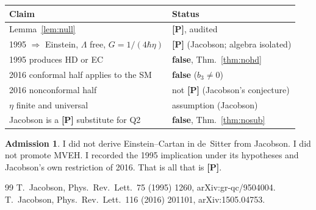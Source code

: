 \documentclass[11pt]{article}
\theoremstyle{definition}
\newtheorem*{admission}{Admission}
\newcommand{\pP}{\textbf{[P]}}
\begin{document}
\begin{center}
\begin{tabular}{@{}p{}p{}@{}}
\toprule
Claim & Status \\
\midrule
Lemma~\ref{lem:null} & \pP{}, audited \\
1995 $\Rightarrow$ Einstein, $\Lambda$ free, $G=1/(4\hbar\eta)$
  & \pP{} (Jacobson; algebra isolated) \\
1995 produces HD or EC & \textbf{false}, Thm.~\ref{thm:nohd} \\
2016 conformal half applies to the SM & \textbf{false} ($b_3\neq 0$) \\
2016 nonconformal half & not \pP{} (Jacobson's conjecture) \\
$\eta$ finite and universal & assumption (Jacobson) \\
Jacobson is a \pP{} substitute for Q2 & \textbf{false},
  Thm.~\ref{thm:nosub} \\
\bottomrule
\end{tabular}
\end{center}

\begin{admission}
I did not derive Einstein--Cartan in de~Sitter from Jacobson. I
did not promote MVEH. I recorded the 1995 implication under its
hypotheses and Jacobson's own restriction of 2016. That is all
that is \pP{}.
\end{admission}

\begin{thebibliography}{99}
T.~Jacobson,
Phys.\ Rev.\ Lett.\ 75 (1995) 1260, arXiv:gr-qc/9504004.
T.~Jacobson,
Phys.\ Rev.\ Lett.\ 116 (2016) 201101, arXiv:1505.04753.
\end{thebibliography}
\end{document}
